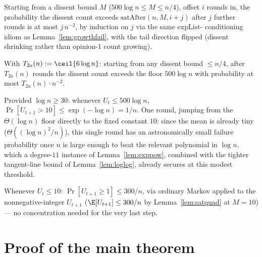 \begin{lemma}\label{lem:satfail}
  \leanok
  Starting from a dissent bound $M$ ($500\log n\le M\le n/4$), offset $i$
  rounds in, the probability the dissent count exceeds
  $\mathrm{satAfter}(n,M,i+j)$ after $j$ further rounds is at most
  $j\,n^{-2}$, by induction on $j$ via the same $\mathrm{expList}$-
  conditioning idiom as Lemma~\ref{lem:growthfail}, with the tail direction
  flipped (dissent shrinking rather than opinion-$1$ count growing).
\end{lemma}

\begin{lemma}\label{lem:stage2a}
  \leanok
  With $T_{2a}(n) := \ceil{6\log n}$: starting from any dissent bound
  $\le n/4$, after $T_{2a}(n)$ rounds the dissent count exceeds the floor
  $500\log n$ with probability at most $T_{2a}(n)\cdot n^{-2}$.
\end{lemma}

\begin{lemma}[Stage 2b]\label{lem:stage2b}
  \leanok
  Provided $\log n\ge30$: whenever $U_t\le500\log n$,
  $\Pr[U_{t+1}>10] \le \exp(-\log n) = 1/n$. One round, jumping from the
  $\Theta(\log n)$ floor directly to the fixed constant $10$: since the
  mean is already tiny ($\Theta((\log n)^2/n)$), this single round has an
  astronomically small failure probability once $n$ is large enough to beat
  the relevant polynomial in $\log n$, which a degree-$11$ instance of
  Lemma~\ref{lem:exppow}, combined with the tighter tangent-line bound of
  Lemma~\ref{lem:loglog}, already secures at this modest threshold.
\end{lemma}

\begin{lemma}[Stage 2c]\label{lem:stage2c}
  \leanok
  Whenever $U_t\le10$: $\Pr[U_{t+1}\ge1] \le 300/n$, via ordinary Markov
  applied to the nonnegative-integer $U_{t+1}$ ($\E[U_{t+1}]\le300/n$ by
  Lemma~\ref{lem:satquad} at $M=10$) --- no concentration needed for the
  very last step.
\end{lemma}

\section{Proof of the main theorem}\label{sec:proof-main}

